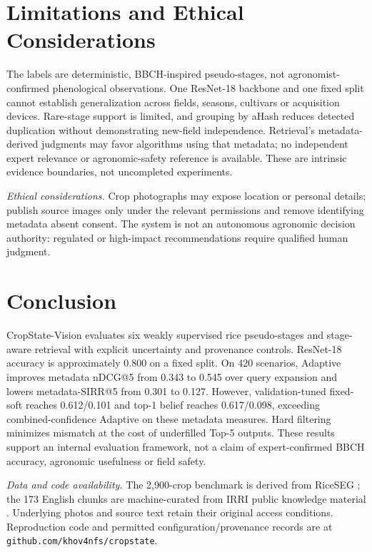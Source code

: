 \documentclass[conference,a4paper]{IEEEtran}
\begin{document}
\section{Limitations and Ethical Considerations}
\label{sec:limitations}

The labels are deterministic, BBCH-inspired pseudo-stages, not agronomist-confirmed phenological observations. One ResNet-18 backbone and one fixed split cannot establish generalization across fields, seasons, cultivars or acquisition devices. Rare-stage support is limited, and grouping by aHash reduces detected duplication without demonstrating new-field independence. Retrieval's metadata-derived judgments may favor algorithms using that metadata; no independent expert relevance or agronomic-safety reference is available. These are intrinsic evidence boundaries, not uncompleted experiments.

\textit{Ethical considerations.} Crop photographs may expose location or personal details; publish source images only under the relevant permissions and remove identifying metadata absent consent. The system is not an autonomous agronomic decision authority: regulated or high-impact recommendations require qualified human judgment.

\section{Conclusion}

CropState-Vision evaluates six weakly supervised rice pseudo-stages and stage-aware retrieval with explicit uncertainty and provenance controls. ResNet-18 accuracy is approximately 0.800 on a fixed split. On 420 scenarios, Adaptive improves metadata nDCG@5 from 0.343 to 0.545 over query expansion and lowers metadata-SIRR@5 from 0.301 to 0.127. However, validation-tuned fixed-soft reaches 0.612/0.101 and top-1 belief reaches 0.617/0.098, exceeding combined-confidence Adaptive on these metadata measures. Hard filtering minimizes mismatch at the cost of underfilled Top-5 outputs. These results support an internal evaluation framework, not a claim of expert-confirmed BBCH accuracy, agronomic usefulness or field safety.

\textit{Data and code availability.} The 2{,}900-crop benchmark is derived from RiceSEG \cite{zhou2025riceseg}; the 173 English chunks are machine-curated from IRRI public knowledge material \cite{irri_knowledge_bank}. Underlying photos and source text retain their original access conditions. Reproduction code and permitted configuration/provenance records are at \texttt{github.com/khov4nfs/cropstate}.



\end{document}
